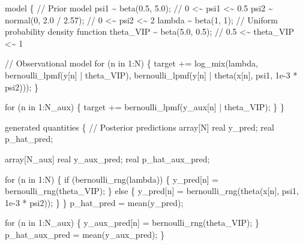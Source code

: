 \documentclass[
  letterpaper,
  DIV=11,
  numbers=noendperiod]{scrartcl}
\newenvironment{Shaded}{\begin{snugshade}}{\end{snugshade}}
\newcommand{\CommentTok}[1]{\textcolor[rgb]{0.37,0.37,0.37}{#1}}
\newcommand{\ControlFlowTok}[1]{\textcolor[rgb]{0.00,0.23,0.31}{#1}}
\newcommand{\DataTypeTok}[1]{\textcolor[rgb]{0.68,0.00,0.00}{#1}}
\newcommand{\DecValTok}[1]{\textcolor[rgb]{0.68,0.00,0.00}{#1}}
\newcommand{\FloatTok}[1]{\textcolor[rgb]{0.68,0.00,0.00}{#1}}
\newcommand{\KeywordTok}[1]{\textcolor[rgb]{0.00,0.23,0.31}{#1}}
\newcommand{\NormalTok}[1]{\textcolor[rgb]{0.00,0.23,0.31}{#1}}
\begin{document}
\begin{codelisting}
\begin{Shaded}
\begin{Highlighting}[]
\KeywordTok{model}\NormalTok{ \{}
  \CommentTok{// Prior model}
\NormalTok{  psi1 \textasciitilde{} beta(}\FloatTok{0.5}\NormalTok{, }\FloatTok{5.0}\NormalTok{);        }\CommentTok{// 0   \textless{}\textasciitilde{}    psi1   \textless{}\textasciitilde{} 0.5}
\NormalTok{  psi2 \textasciitilde{} normal(}\DecValTok{0}\NormalTok{, }\FloatTok{2.0}\NormalTok{ / }\FloatTok{2.57}\NormalTok{); }\CommentTok{// 0   \textless{}\textasciitilde{}    psi2   \textless{}\textasciitilde{} 2}
\NormalTok{  lambda \textasciitilde{} beta(}\DecValTok{1}\NormalTok{, }\DecValTok{1}\NormalTok{);          }\CommentTok{// Uniform probability density function}
\NormalTok{  theta\_VIP \textasciitilde{} beta(}\FloatTok{5.0}\NormalTok{, }\FloatTok{0.5}\NormalTok{);   }\CommentTok{// 0.5 \textless{}\textasciitilde{} theta\_VIP \textless{}\textasciitilde{} 1}

  \CommentTok{// Observational model}
  \ControlFlowTok{for}\NormalTok{ (n }\ControlFlowTok{in} \DecValTok{1}\NormalTok{:N) \{}
    \KeywordTok{target +=}\NormalTok{ log\_mix(lambda,}
\NormalTok{                      bernoulli\_lpmf(y[n] | theta\_VIP),}
\NormalTok{                      bernoulli\_lpmf(y[n] | theta(x[n], psi1, }\FloatTok{1e{-}3}\NormalTok{ * psi2)));}
\NormalTok{  \}}

  \ControlFlowTok{for}\NormalTok{ (n }\ControlFlowTok{in} \DecValTok{1}\NormalTok{:N\_aux) \{}
    \KeywordTok{target +=}\NormalTok{ bernoulli\_lpmf(y\_aux[n] | theta\_VIP);}
\NormalTok{  \}}
\NormalTok{\}}

\KeywordTok{generated quantities}\NormalTok{ \{}
  \CommentTok{// Posterior predictions}
  \DataTypeTok{array}\NormalTok{[N] }\DataTypeTok{real}\NormalTok{ y\_pred;}
  \DataTypeTok{real}\NormalTok{ p\_hat\_pred;}

  \DataTypeTok{array}\NormalTok{[N\_aux] }\DataTypeTok{real}\NormalTok{ y\_aux\_pred;}
  \DataTypeTok{real}\NormalTok{ p\_hat\_aux\_pred;}

  \ControlFlowTok{for}\NormalTok{ (n }\ControlFlowTok{in} \DecValTok{1}\NormalTok{:N) \{}
    \ControlFlowTok{if}\NormalTok{ (bernoulli\_rng(lambda)) \{}
\NormalTok{      y\_pred[n] = bernoulli\_rng(theta\_VIP);}
\NormalTok{    \} }\ControlFlowTok{else}\NormalTok{ \{}
\NormalTok{      y\_pred[n] = bernoulli\_rng(theta(x[n], psi1, }\FloatTok{1e{-}3}\NormalTok{ * psi2));}
\NormalTok{    \}}
\NormalTok{  \}}
\NormalTok{  p\_hat\_pred = mean(y\_pred);}

  \ControlFlowTok{for}\NormalTok{ (n }\ControlFlowTok{in} \DecValTok{1}\NormalTok{:N\_aux) \{}
\NormalTok{    y\_aux\_pred[n] = bernoulli\_rng(theta\_VIP);}
\NormalTok{  \}}
\NormalTok{  p\_hat\_aux\_pred = mean(y\_aux\_pred);}
\NormalTok{\}}
\end{Highlighting}
\end{Shaded}

\end{codelisting}
\end{document}
